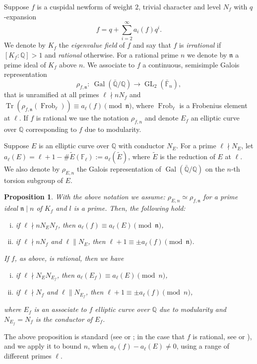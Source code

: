 \documentclass[12pt]{amsart}
\numberwithin{equation}{section}
\newtheorem{proposition}[lemma]{Proposition}
\theoremstyle{definition}
\theoremstyle{remark}
\newcommand{\QQ}{\mathbb{Q}}
\newcommand{\bQQ}{\bar{\mathbb{Q}}}
\newcommand{\Fl}{\mathbb{F}_{\ell}}
\newcommand{\bF}{\bar{\mathbb{F}}}
\newcommand{\fn}{\mathfrak{n}}
\newcommand{\rhoE}{\rho_{E,n}}
\newcommand{\rhof}{\rho_{f,\fn}}
\newcommand{\rhofn}{\rho_{f,n}}
\DeclareMathOperator{\Gal}{Gal}
\DeclareMathOperator{\GL}{GL}
\DeclareMathOperator{\Tr}{Tr}
\DeclareMathOperator{\Frob}{Frob}
\begin{document}
Suppose $f$ is a cuspidal newform of weight $2$, trivial character and level $N_f$ with $q$-expansion
\begin{equation*}
    f = q + \sum_{i=2}^{\infty} a_i(f)q^i.
\end{equation*}
We denote by $K_f$ the \textit{eigenvalue field} of $f$ and say that $f$ is \textit{irrational} if $[K_f:\QQ]>1$ and \textit{rational} otherwise. For a rational prime $n$ we denote by $\fn$ a prime ideal of $K_f$ above $n$. We associate to $f$ a continuous, semisimple Galois representation
\begin{equation*}
    \rhof:~\Gal(\bQQ/\QQ)\rightarrow\GL_2(\bF_n),
\end{equation*}
that is unramified at all primes $\ell\nmid nN_f$ and 
$\Tr(\rhof(\Frob_{\ell}))\equiv a_\ell(f)\pmod{\fn}$, 
where $\Frob_{\ell}$ is a Frobenius element at $\ell$. 
If $f$ is rational we use the notation $\rhofn$ and denote $E_f$ an elliptic 
curve over $\QQ$ corresponding to $f$ due to modularity.

Suppose $E$ is an elliptic curve over $\QQ$ with conductor $N_E$. For a prime 
$\ell \nmid N_E$, let $a_{\ell}(E)=\ell + 1 - \#\tilde{E}(\Fl):=a_{\ell}(\tilde{E})$, where $\tilde{E}$ is the reduction of $E$ at $\ell$. We also denote by $\rhoE$ the Galois representation of $\Gal(\bQQ/\QQ)$ on the $n$-th torsion subgroup of $E$.

\begin{proposition}\label{prop:elimination_step}
With the above notation we assume:  $\rhoE\simeq \rhof$ for a prime ideal $\fn\mid n$ of $K_f$ and $l$ is a prime. Then, the following hold:
\begin{enumerate}[(i)]
    \item if $\ell\nmid nN_EN_f$, then $a_\ell(f)\equiv a_\ell(E)\pmod{\fn}$,
    \item if $\ell\nmid nN_f$ and $\ell\| N_E$, then $\ell + 1\equiv\pm a_\ell(f)\pmod{\fn}$.
\end{enumerate}
If $f$, as above, is rational, then we have
\begin{enumerate}[(i)]
    \item if $\ell\nmid N_EN_{E_f}$, then $a_\ell(E_f)\equiv a_\ell(E)\pmod{n}$,
    \item if $\ell\nmid N_f$ and $\ell\| N_{E_f}$, then $\ell + 1\equiv\pm a_\ell(f)\pmod{n}$,
\end{enumerate}
where $E_f$ is an associate to $f$ elliptic curve over $\QQ$ due to modularity and $N_{E_f}=N_f$ is the conductor of $E_f$.
\end{proposition}
%
The above proposition is standard (see \cite[Proposition 4.3]{BennettSkinner04} or \cite[p. 203]{Serre87}; in the case that $f$ is rational, see \cite[Lemma 6.4]{BugeaudMignotteSiksek06} or \cite[Proposition 3]{KrausOesterle92}), and we apply it to bound $n$, when $a_\ell(f)- a_\ell(E)\neq 0$, using a 
range of different primes $\ell$. 
\end{document}
